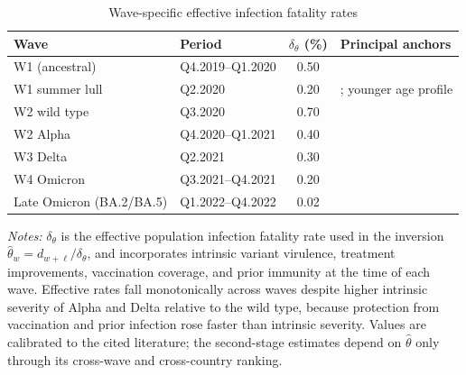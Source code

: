 \documentclass[12pt, a4paper]{article}
\begin{document}
\begin{table}[htbp]
\centering
\caption{Wave-specific effective infection fatality rates}
\label{tab:ifr_by_wave}
\begin{tabular}{llcl}
\toprule
Wave & Period & $\delta_\theta$ (\%) & Principal anchors \\
\midrule
W1 (ancestral)      & Q4.2019--Q1.2020 & 0.50 & \citet{levin2020,meyerowitzkatz2020,brazeau2020} \\
W1 summer lull      & Q2.2020          & 0.20 & \citet{recovery2021}; younger age profile \\
W2 wild type        & Q3.2020          & 0.70 & \citet{covidforecast2022,marziano2023} \\
W2 Alpha            & Q4.2020--Q1.2021 & 0.40 & \citet{davies2021nature,challen2021,nyberg2022} \\
W3 Delta            & Q2.2021          & 0.30 & \citet{marziano2023,ward2024} \\
W4 Omicron          & Q3.2021--Q4.2021 & 0.20 & \citet{marziano2023,ward2024,erikstrup2022} \\
Late Omicron (BA.2/BA.5) & Q1.2022--Q4.2022 & 0.02 & \citet{ward2024,erikstrup2022} \\
\bottomrule
\end{tabular}
\begin{minipage}{0.92\linewidth}
\vspace{4pt}
\footnotesize
\textit{Notes:} $\delta_\theta$ is the effective population infection fatality
rate used in the inversion $\hat{\theta}_w = d_{w+\ell}/\delta_\theta$, and
incorporates intrinsic variant virulence, treatment improvements, vaccination
coverage, and prior immunity at the time of each wave. Effective rates fall
monotonically across waves despite higher intrinsic severity of Alpha and
Delta relative to the wild type, because protection from vaccination and
prior infection rose faster than intrinsic severity. Values are calibrated to
the cited literature; the second-stage estimates depend on $\hat{\theta}$ only
through its cross-wave and cross-country ranking.
\end{minipage}
\end{table}

\end{document}
